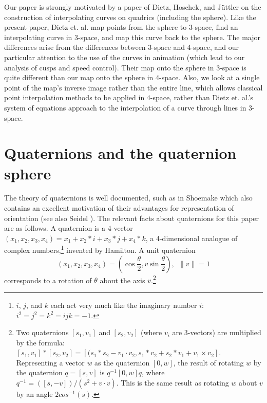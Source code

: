
Our paper is strongly motivated by %
a paper of Dietz, Hoschek, and J\"{u}ttler
\cite{dietz93} on the construction of interpolating curves on quadrics 
(including the sphere).
Like the present paper, Dietz et. al. map points from the sphere to
3-space, find an interpolating curve in 3-space, and map this curve back
to the sphere.
The major differences arise from the differences between 3-space and
4-space, and our particular attention to the use of the curves in
animation (which lead to our analysis of cusps and speed control).
Their map onto the sphere in 3-space is quite different than our map onto the
sphere in 4-space.
Also, we look at a single point of the map's inverse image rather than the
entire line,
which allows classical point interpolation methods to be applied in 4-space,
rather than Dietz et. al.'s system of equations approach to the interpolation 
of a curve through lines in 3-space.

\section{Quaternions and the quaternion sphere}
\label{sec:quaternion}

The theory of quaternions is well documented, such as in Shoemake
\cite{shoemake85} which also contains an excellent motivation of their
advantages for representation of orientation (see also Seidel
\cite{seidel90}).
The relevant facts about quaternions for this paper are as follows.
%
A quaternion is a 4-vector $(x_1,x_2,x_3,x_4) = x_1 + x_2*i + x_3*j +
x_4*k$, a 4-dimensional analogue of complex numbers,\footnote{$i$, $j$,
	and $k$ each act very much like the imaginary number $i$:
	$i^2 = j^2 = k^2 = ijk = -1$.}
invented by Hamilton.
A unit quaternion 
\[ (x_1,x_2,x_3,x_4) 
= (\cos \frac{\theta}{2}, v \sin \frac{\theta}{2}), \ \ \|v\| = 1
\]
corresponds to a rotation of $\theta$ about the axis $v$.\footnote{Two
	quaternions $[s_1,v_1]$ and $[s_2,v_2]$ (where $v_i$ are 3-vectors)
	are multiplied by the formula: 
	$[s_1,v_1] * [s_2,v_2] = [(s_1*s_2 - v_1 \cdot v_2,
		s_1*v_2 + s_2*v_1 + v_1 \times v_2]$.
	Representing a vector $w$ as the quaternion $[0,w]$,
	the result of rotating $w$ by the quaternion $q = [s,v]$ is
	$q^{-1} [0,w] q$, where $q^{-1} = ([s,-v])/(s^2 + v \cdot v)$.
	This is the same result as rotating $w$ about $v$ by an angle 
	$2 cos^{-1}(s)$.}


